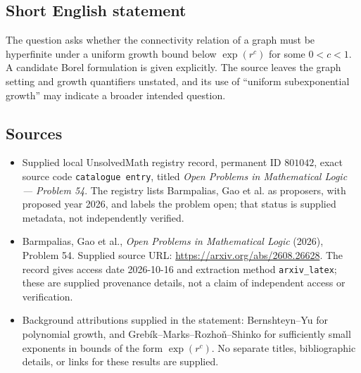 \documentclass[11pt]{article}
\begin{document}
\subsection{Short English statement}
The question asks whether the connectivity relation of a graph must be hyperfinite under a uniform growth bound below \(\exp(r^c)\) for some \(0<c<1\). A candidate Borel formulation is given explicitly. The source leaves the graph setting and growth quantifiers unstated, and its use of ``uniform subexponential growth'' may indicate a broader intended question.
\subsection{Sources}
\begin{itemize}
\item Supplied local UnsolvedMath registry record, permanent ID \(801042\), exact source code \texttt{catalogue entry}, titled \emph{Open Problems in Mathematical Logic --- Problem 54}. The registry lists Barmpalias, Gao et al. as proposers, with proposed year 2026, and labels the problem open; that status is supplied metadata, not independently verified.
\item Barmpalias, Gao et al., \emph{Open Problems in Mathematical Logic} (2026), Problem 54. Supplied source URL: \url{https://arxiv.org/abs/2608.26628}. The record gives access date 2026-10-16 and extraction method \texttt{arxiv\_latex}; these are supplied provenance details, not a claim of independent access or verification.
\item Background attributions supplied in the statement: Bernshteyn--Yu for polynomial growth, and Grebík--Marks--Rozhoň--Shinko for sufficiently small exponents in bounds of the form \(\exp(r^c)\). No separate titles, bibliographic details, or links for these results are supplied.
\end{itemize}
\end{document}

